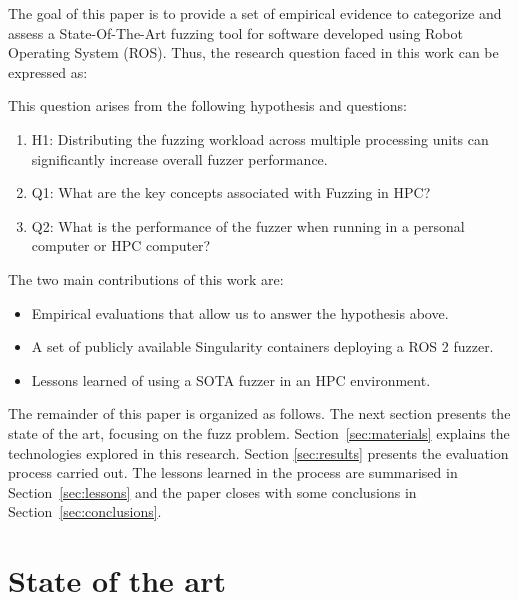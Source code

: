 \documentclass{svproc}
\begin{document}
The goal of this paper is to provide a set of empirical evidence to categorize and assess a State-Of-The-Art fuzzing tool for software developed using Robot Operating System (ROS). Thus, the research question faced in this work can be expressed as:\\


\noindent{}
\newline

This question arises from the following hypothesis and questions: 

\begin{enumerate}
    \item H1: Distributing the fuzzing workload across multiple processing units can significantly increase overall fuzzer performance. 
    \item Q1: What are the key concepts associated with Fuzzing in HPC?
    \item Q2: What is the performance of the fuzzer when running in a personal computer or HPC computer?
    
\end{enumerate}

The two main contributions of this work are:
\begin{itemize}
    \item Empirical evaluations that allow us to answer the hypothesis above.
    \item A set of publicly available Singularity containers deploying a ROS 2 fuzzer. 
    \item Lessons learned of using a SOTA fuzzer in an HPC environment. 
\end{itemize}


The remainder of this paper is organized as follows. The next section presents the state of the art, focusing on the
fuzz problem. Section~\ref{sec:materials} explains the technologies explored in this research. Section
\ref{sec:results} presents the evaluation process carried out. The lessons learned in the process are summarised in Section~\ref{sec:lessons} and the paper closes with some conclusions in Section~\ref{sec:conclusions}.


\section{State of the art}
\end{document}
